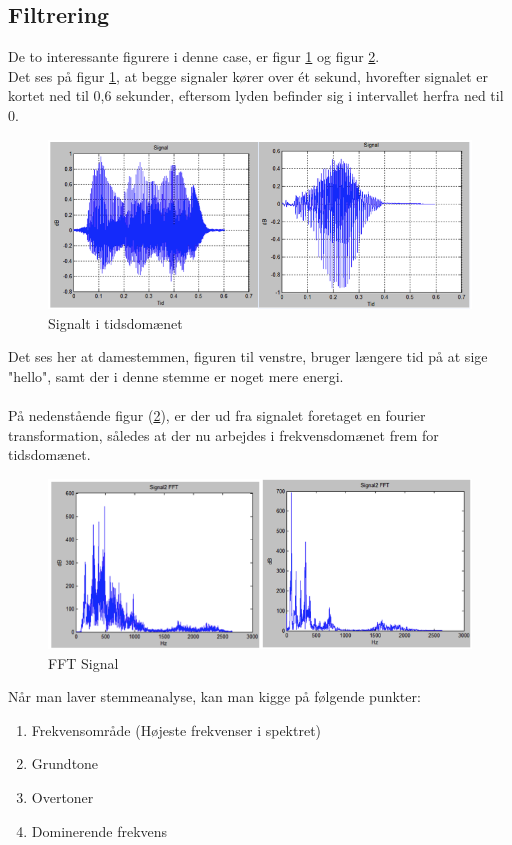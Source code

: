 \subsection{Filtrering}
De to interessante figurere i denne case, er figur \ref{tidsdomaeet} og figur \ref{FFT Signal}. \\ Det ses på figur \ref{tidsdomaeet}, at begge signaler kører over ét sekund, hvorefter signalet er kortet ned til 0,6 sekunder, eftersom lyden befinder sig i intervallet herfra ned til 0.
\begin{figure}[H]
	\centering
	\includegraphics[width=1\textwidth]{Figurer/10}
	\caption{Signalt i tidsdomænet}
	\label{tidsdomaeet}
\end{figure}
Det ses her at damestemmen, figuren til venstre, bruger længere tid på at sige "hello", samt der i denne stemme er noget mere energi. \\ \\
På nedenstående figur (\ref{FFT Signal}), er der ud fra signalet foretaget en fourier transformation, således at der nu arbejdes i frekvensdomænet frem for tidsdomænet.
\begin{figure}[H]
	\centering
	\includegraphics[width=1\textwidth]{Figurer/8}
	\caption{FFT Signal}
	\label{FFT Signal}
\end{figure}
Når man laver stemmeanalyse, kan man kigge på følgende punkter:
\begin{enumerate}
	\item Frekvensområde (Højeste frekvenser i spektret)
	\item Grundtone
	\item Overtoner
	\item Dominerende frekvens
\end{enumerate}
